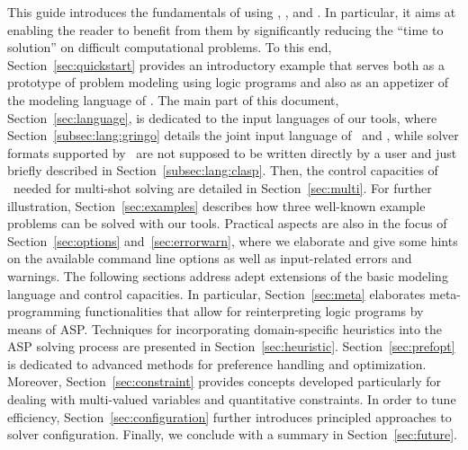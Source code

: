 This guide introduces the fundamentals of using
\gringo, \clasp, and \clingo.
In particular, it aims at enabling the reader to benefit from them
by significantly reducing the ``time to solution'' on difficult computational problems.
To this end,
Section~\ref{sec:quickstart}
provides an introductory example 
that serves both as a prototype of problem modeling using logic programs
and also as an appetizer of the modeling language of \gringo.
The main part of this document, Section~\ref{sec:language},
is dedicated to the input languages of our tools,
where Section~\ref{subsec:lang:gringo}
details the joint input language of \gringo\ and \clingo,
while solver formats supported by \clasp\
are not supposed to be written directly by a user
and just briefly described in Section~\ref{subsec:lang:clasp}.
Then,
the control capacities of \clingo\ needed for multi-shot solving are detailed in Section~\ref{sec:multi}.
For %
further illustration,
Section~\ref{sec:examples} describes how three well-known example problems
can be solved with our tools.
Practical aspects are also in the focus of Section~\ref{sec:options} and~\ref{sec:errorwarn},
where we elaborate and give some hints on the available command line options
as well as input-related errors and warnings. %
The following sections address adept extensions of the basic modeling language
and control capacities.
In particular, Section~\ref{sec:meta} elaborates meta-programming functionalities
that allow for reinterpreting logic programs by means of ASP.
Techniques for incorporating domain-specific heuristics into the ASP solving
process are presented in Section~\ref{sec:heuristic}.
Section~\ref{sec:prefopt} is dedicated to advanced methods
for preference handling and optimization.
Moreover, Section~\ref{sec:constraint} provides concepts developed particularly
for dealing with multi-valued variables and quantitative constraints.
In order to tune efficiency,
Section~\ref{sec:configuration} further introduces principled approaches
to solver configuration.
Finally, we conclude with a summary in Section~\ref{sec:future}.

